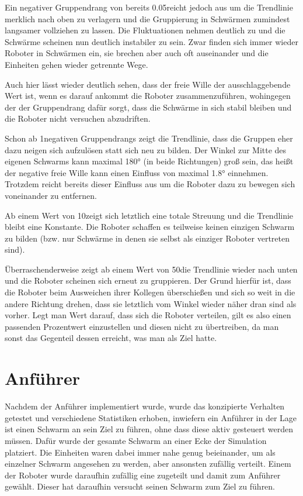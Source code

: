 Ein negativer Gruppendrang von bereits 0.05\per reicht jedoch aus um die Trendlinie merklich nach oben zu verlagern und die Gruppierung in Schwärmen zumindest langsamer vollziehen zu lassen. Die Fluktuationen nehmen deutlich zu und die Schwärme scheinen nun deutlich instabiler zu sein. Zwar finden sich immer wieder Roboter in Schwärmen ein, sie brechen aber auch oft auseinander und die Einheiten gehen wieder getrennte Wege.

Auch hier lässt wieder deutlich sehen, dass der freie Wille der ausschlaggebende Wert ist, wenn es darauf ankommt die Roboter zusammenzuführen, wohingegen der der Gruppendrang dafür sorgt, dass die Schwärme in sich stabil bleiben und die Roboter nicht versuchen abzudriften.

Schon ab 1\per negativen Gruppendrangs zeigt die Trendlinie, dass die Gruppen eher dazu neigen sich aufzulösen statt sich neu zu bilden. Der Winkel zur Mitte des eigenen Schwarms kann maximal 180° (in beide Richtungen) groß sein, das heißt der negative freie Wille kann einen Einfluss von maximal 1.8° einnehmen. Trotzdem reicht bereits dieser Einfluss aus um die Roboter dazu zu bewegen sich voneinander zu entfernen.

Ab einem Wert von 10\per zeigt sich letztlich eine totale Streuung und die Trendlinie bleibt eine Konstante. Die Roboter schaffen es teilweise keinen einzigen Schwarm zu bilden (bzw. nur Schwärme in denen sie selbst als einziger Roboter vertreten sind).

Überraschenderweise zeigt ab einem Wert von 50\per die Trendlinie wieder nach unten und die Roboter scheinen sich erneut zu gruppieren. Der Grund hierfür ist, dass die Roboter beim Ausweichen ihrer Kollegen überschießen und sich so weit in die andere Richtung drehen, dass sie letztlich vom Winkel wieder näher dran sind als vorher. Legt man Wert darauf, dass sich die Roboter verteilen, gilt es also einen passenden Prozentwert einzustellen und diesen nicht zu übertreiben, da man sonst das Gegenteil dessen erreicht, was man als Ziel hatte.







\section{Anführer}

Nachdem der Anführer implementiert wurde, wurde das konzipierte Verhalten getestet und verschiedene Statistiken erhoben, inwiefern ein Anführer in der Lage ist einen Schwarm an sein Ziel zu führen, ohne dass diese aktiv gesteuert werden müssen.
Dafür wurde der gesamte Schwarm an einer Ecke der Simulation platziert. Die Einheiten waren dabei immer nahe genug beieinander, um als einzelner Schwarm angesehen zu werden, aber ansonsten zufällig verteilt. Einem der Roboter wurde daraufhin zufällig eine  zugeteilt und damit zum Anführer gewählt. Dieser hat daraufhin versucht seinen Schwarm zum Ziel zu führen.

